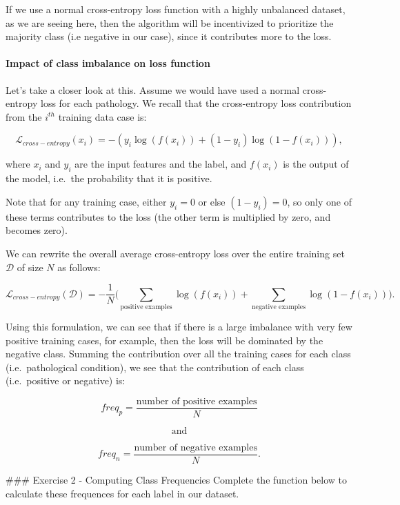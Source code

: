 \documentclass[11pt]{article}
\begin{document}
If we use a normal cross-entropy loss function with a highly unbalanced
dataset, as we are seeing here, then the algorithm will be incentivized
to prioritize the majority class (i.e negative in our case), since it
contributes more to the loss.

    \hypertarget{impact-of-class-imbalance-on-loss-function}{%
\paragraph{Impact of class imbalance on loss
function}\label{impact-of-class-imbalance-on-loss-function}}

Let's take a closer look at this. Assume we would have used a normal
cross-entropy loss for each pathology. We recall that the cross-entropy
loss contribution from the \(i^{th}\) training data case is:

\[\mathcal{L}_{cross-entropy}(x_i) = -(y_i \log(f(x_i)) + (1-y_i) \log(1-f(x_i))),\]

where \(x_i\) and \(y_i\) are the input features and the label, and
\(f(x_i)\) is the output of the model, i.e.~the probability that it is
positive.

Note that for any training case, either \(y_i=0\) or else \((1-y_i)=0\),
so only one of these terms contributes to the loss (the other term is
multiplied by zero, and becomes zero).

We can rewrite the overall average cross-entropy loss over the entire
training set \(\mathcal{D}\) of size \(N\) as follows:

\[\mathcal{L}_{cross-entropy}(\mathcal{D}) = - \frac{1}{N}\big( \sum_{\text{positive examples}} \log (f(x_i)) + \sum_{\text{negative examples}} \log(1-f(x_i)) \big).\]

Using this formulation, we can see that if there is a large imbalance
with very few positive training cases, for example, then the loss will
be dominated by the negative class. Summing the contribution over all
the training cases for each class (i.e.~pathological condition), we see
that the contribution of each class (i.e.~positive or negative) is:

\[freq_{p} = \frac{\text{number of positive examples}}{N} \]

\[\text{and}\]

\[freq_{n} = \frac{\text{number of negative examples}}{N}.\]

     \#\#\# Exercise 2 - Computing Class Frequencies Complete the function
below to calculate these frequences for each label in our dataset.
\end{document}
